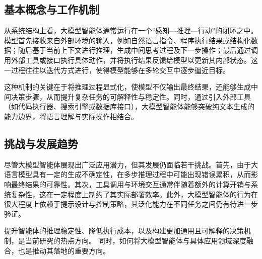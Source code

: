 \subsection{基本概念与工作机制}

从系统结构上看，大模型智能体通常运行在一个“感知—推理—行动”的闭环之中。模型首先接收来自外部环境的输入，例如自然语言指令、程序执行结果或结构化数据；随后基于当前上下文进行推理，生成中间思考过程及下一步操作；最后通过调用外部工具或接口执行具体动作，并将执行结果反馈给模型以更新其内部状态。这一过程往往以迭代方式进行，使得模型能够在多轮交互中逐步逼近目标。

这种机制的关键在于将推理过程显式化，使模型不仅输出最终结果，还能够生成中间决策步骤，从而提升复杂任务的可解释性与稳定性。同时，通过引入外部工具（如代码执行器、搜索引擎或数据库接口），大模型智能体能够突破纯文本生成的能力边界，将语言理解与实际操作相结合。


\subsection{挑战与发展趋势}

尽管大模型智能体展现出广泛应用潜力，但其发展仍面临若干挑战。首先，由于大语言模型具有一定的生成不确定性，在多步推理过程中可能出现错误累积，从而影响最终结果的可靠性。其次，工具调用与环境交互通常伴随着额外的计算开销与系统复杂性，这在一定程度上制约了其实际部署效率。此外，大模型智能体的行为在很大程度上依赖于提示设计与控制策略，其泛化能力在不同任务之间仍有待进一步验证。

提升智能体的推理稳定性、降低执行成本，以及构建更加通用且可解释的决策机制，是当前研究的热点方向。
同时，如何将大模型智能体与具体应用领域深度融合，也是推动其落地的重要方向。